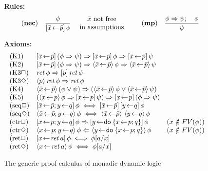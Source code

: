 \begin{figure}
  \textbf{Rules:} 
  \begin{displaymath}\displaystyle
    \quad \NRule{nec}{\phi}{\PDLBox{\bar x\leteq\bar p}\phi}
    \mbox{~~\begin{tabular}{c}$\bar x$ not free\\ in assumptions\end{tabular}}
    \qquad
    \NRule{mp}{\phi\Rightarrow\psi;\quad\phi}{\psi}
  \end{displaymath}
  
  \textbf{Axioms:}
  \begin{displaymath}
    \begin{array}{lll}
      \textrm{(K1)} & \PDLBox{\bar x\leteq\bar p}(\phi\Rightarrow\psi)\Rightarrow
      \PDLBox{\bar x\leteq\bar p}\phi\Rightarrow\PDLBox{\bar x\leteq\bar p}\psi\\
      \textrm{(K2)} & \PDLBox{\bar x\leteq\bar p}(\phi\Rightarrow\psi)\Rightarrow
      \PDLDmd{\bar x\leteq\bar p}\phi\Rightarrow\PDLDmd{\bar x\leteq\bar p}\psi\\
      \textrm{(K3$\Box$)} & \ret{\phi}\Rightarrow\PDLBox{p}\ret{\phi}\\
      \textrm{(K3$\Diamond$)} & \PDLDmd{p}\ret{\phi}\Rightarrow\ret{\phi}\\
      \textrm{(K4)} & \PDLDmd{\bar x\leteq\bar p}(\phi\lor\psi)\Rightarrow
      (\PDLDmd{\bar x\leteq\bar p}\phi\lor\PDLDmd{\bar x\leteq\bar
        p}\psi)\\
      \textrm{(K5)} & (\PDLDmd{\bar x\leteq\bar p}\phi\Rightarrow\PDLBox{\bar x\leteq\bar
        p}\psi)
      \Rightarrow
      \PDLBox{\bar x\leteq\bar p}(\phi\Rightarrow\psi)\\
      \textrm{(seq$\Box$)} & \PDLBox{\bar x\leteq\bar p;y\leteq q}\phi \iff
      \PDLBox{\bar x\leteq\bar p}\PDLBox{y\leteq q}\phi\\
      \textrm{(seq$\Diamond$)} & \PDLDmd{\bar x\leteq\bar p; y\leteq q}\phi\iff
      \PDLDmd{\bar x\leteq\bar p}\,\PDLDmd{y\leteq q}\phi\\
      \textrm{(ctr$\Box$)} &
      \PDLBox{x\leteq p; y\leteq  q}\phi\Rightarrow
      \PDLBox{ y\leteq\DoStmt{ x\leteq p; q}}\phi
      & (x\notin FV(\phi))\\
      \textrm{(ctr$\Diamond$)} & \PDLDmd{ x\leteq p; y\leteq
        q}\phi \Leftarrow   \PDLDmd{ y\leteq\DoStmt{ x\leteq p; q}}\phi& (x\notin FV(\phi))\\
      \textrm{(ret$\Box$)} & \PDLBox{x\leteq \ret{a}}\phi\iff\phi[a/x]\\
      \textrm{(ret$\Diamond$)} & 
      \PDLDmd{x\leteq \ret{a}}\phi\iff\phi[a/x]
    \end{array}
  \end{displaymath}

  \caption{The generic proof calculus of monadic dynamic logic}
  \label{fig:mon-dyn-logic}
\end{figure}

